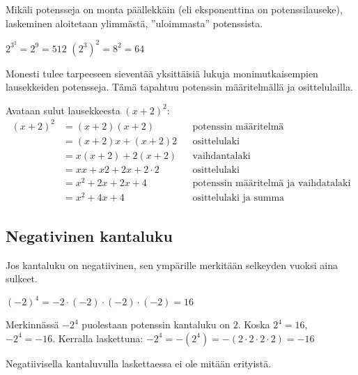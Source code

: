 Mikäli potensseja on monta päällekkäin (eli eksponenttina on potenssilauseke), laskeminen aloitetaan ylimmästä, ''uloimmasta'' potenssista.

\begin{esimerkki}
$2^{3^2}= 2^9 = 512$
$(2^3)^2=8^2=64$
\end{esimerkki}

Monesti tulee tarpeeseen sieventää yksittäisiä lukuja monimutkaisempien lausekkeiden potensseja. Tämä tapahtuu potenssin määritelmällä ja osittelulailla.
\begin{esimerkki}
 Avataan sulut lausekkeesta $(x+2)^2$:
	\begin{align*}
	(x+2)^2
	&=(x+2)(x+2) && \text{potenssin määritelmä} \\
	&=(x+2)x+(x+2)2 && \text{osittelulaki} \\
	&=x(x+2)+2(x+2) && \text{vaihdantalaki} \\
	&=xx+x2+2x+2\cdot2 && \text{osittelulaki} \\
	&=x^2+2x+2x+4 && \text{potenssin määritelmä ja vaihdatalaki} \\
	&=x^2+4x+4 && \text{osittelulaki ja summa}
	\end{align*}
	
\end{esimerkki} %

\subsection*{Negativinen kantaluku}

Jos kantaluku on negatiivinen, sen ympärille merkitään selkeyden vuoksi aina sulkeet.

\begin{esimerkki}
$(-2)^4 = -2 \cdot (-2)\cdot(-2)\cdot(-2) = 16$

Merkinnässä $-2^4$ puolestaan potenssin kantaluku on $2$. Koska $2^4 = 16$,
$-2^4=-16$. Kerralla laskettuna: $-2^4 =-(2^4)= -(2 \cdot 2\cdot 2 \cdot 2) = -16$
\end{esimerkki}

Negatiivisella kantaluvulla laskettaessa ei ole mitään erityistä.
 
    \begin{esimerkki}

    \end{esimerkki}
    
